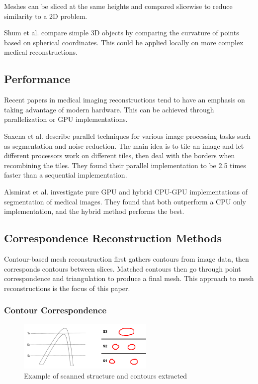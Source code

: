 \documentclass[11p, titlepage]{article}
\begin{document}
Meshes can be sliced at the same heights and compared slicewise to reduce similarity to a 2D problem.

Shum et al. \cite{shum19963d} compare simple 3D objects by comparing the curvature of points based on spherical coordinates. This could be applied locally on more complex medical reconstructions.

\subsection{Performance}

Recent papers in medical imaging reconstructions tend to have an emphasis on taking advantage of modern hardware. This can be achieved through parallelization or GPU implementations.

Saxena et al. \cite{saxena2013image} describe parallel techniques for various image processing tasks such as segmentation and noise reduction. The main idea is to tile an image and let different processors work on different tiles, then deal with the borders when recombining the tiles. They found their parallel implementation to be 2.5 times faster than a sequential implementation.

Alsmirat et al. \cite{alsmirat2017accelerating} investigate pure GPU and hybrid CPU-GPU implementations of segmentation of medical images. They found that both outperform a CPU only implementation, and the hybrid method performs the best.

\subsection{Correspondence Reconstruction Methods}

Contour-based mesh reconstruction first gathers contours from image data, then corresponds contours between slices. Matched contours then go through point correspondence and triangulation to produce a final mesh. This approach to mesh reconstructions is the focus of this paper.

\subsubsection{Contour Correspondence}

\begin{figure}
\centering
\includegraphics[width=0.58\textwidth]{diagrams/contours_sampled}
\caption{Example of scanned structure and contours extracted \label{fig:contours_sampled}}
\end{figure}
\end{document}
